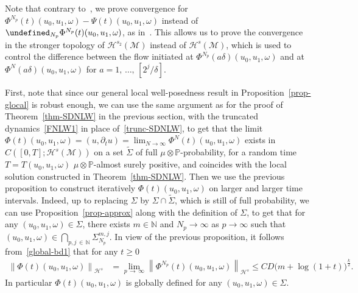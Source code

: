 \documentclass[10pt]{amsart}
\theoremstyle{definition}\newtheorem{defi}[theo]{Definition}\newtheorem{rema}[theo]{Remark}\newtheorem{exam}[theo]{Example}\newtheorem{exem}[theo]{Example}\newtheorem{nota}[theo]{Notation}
\newcommand{\Prob}{\mathbb{P}}
\newcommand{\N}{\mathbb{N}}
\let\P= \undefined
\newcommand{\P}{\mathbf{P}}
\newcommand{\M}{\mathcal{M}}
\renewcommand{\H}{\mathcal{H}}
\newcommand{\dl}{\delta}
\newcommand{\Si}{\Sigma}
\newcommand{\wt}{\widetilde}
\newcommand{\dt}{\partial_t}
\renewcommand{\o}{\omega}
\begin{document}
Note that contrary to~\cite{BTT2}, we prove convergence for $\Phi^{N_p}(t)(u_0,u_1,\o)-\Psi(t)(u_0,u_1,\o)$ instead of $\P_{N_p}\Phi^{N_p}(t)(u_0,u_1,\o)$, as in~\cite{BO96}. This allows us to prove the convergence in the stronger topology of $\H^{s_2}(\M)$ instead of $\H^s(\M)$, which is used to control the difference between the flow initiated at $\Phi^{N_p}(a\dl)(u_0,u_1,\o)$ and at $\Phi^N(a\dl)(u_0,u_1,\o)$ for $a=1,\,\dots,\,[2^j/\dl]$.

First, note that since our general local well-posedness result in Proposition~\ref{prop-glocal} is robust enough, we can use the same argument as for the proof of Theorem~\ref{thm-SDNLW} in the previous section, with the truncated dynamics~\eqref{FNLW1} in place of~\eqref{trunc-SDNLW}, to get that the limit $\Phi(t)(u_0,u_1,\o)=(u,\dt u) = \lim_{N\to\infty}\Phi^N(t)(u_0,u_1,\o)$ exists in $C([0,T];\H^s(\M))$ on a set $\wt\Si$ of full $\mu\otimes\Prob$-probability, for a random time $T=T(u_0,u_1,\o)$ $\mu\otimes\Prob$-almost surely positive, and coincides with the local solution constructed in Theorem~\ref{thm-SDNLW}. Then we use the previous proposition to construct iteratively $\Phi(t)(u_0,u_1,\o)$ on larger and larger time intervals. Indeed, up to replacing $\Si$ by $\Si\cap\wt\Si$, which is still of full probability, we can use Proposition~\ref{prop-approx} along with the definition of $\Si$, to get that for any $(u_0,u_1,\o)\in\Si$, there exists $m\in\N$ and $N_p\to\infty$ as $p\to\infty$ such that $(u_0,u_1,\o)\in \bigcap_{p,j\,\in\,\N}\Si_{N_p}^{m,j}$. In view of the previous proposition, it follows from~\eqref{global-bd1} that for any $t\ge 0$
\begin{align*}
\left\|\Phi(t)(u_0,u_1,\o)\right\|_{\H^{s}}&= \lim_{p\,\to\,\infty} \left\|\Phi^{N_p}(t)(u_0,u_1,\o)\right\|_{\H^{s}} \leq CD\big(m+\log(1+t)\big)^{\frac{k}2}.
\end{align*}
In particular $\Phi(t)(u_0,u_1,\o)$ is globally defined for any $(u_0,u_1,\o)\in\Si$.
\end{document}
